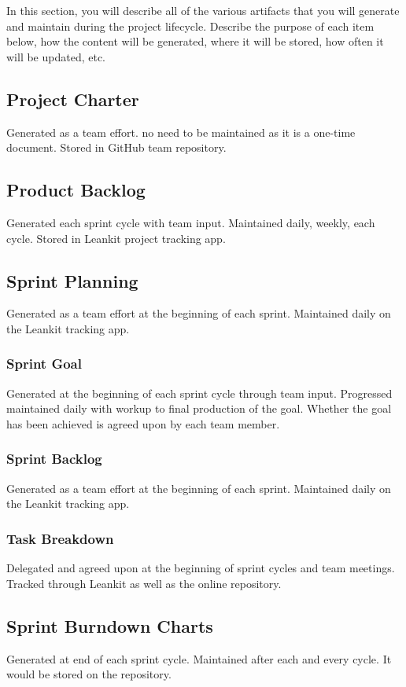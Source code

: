 In this section, you will describe all of the various artifacts that you will generate and maintain during the project lifecycle. Describe the purpose of each item below, how the content will be generated, where it will be stored, how often it will be updated, etc. 

\subsection{Project Charter}
Generated as a team effort. no need to be maintained as it is a one-time document. Stored in GitHub team repository.

\subsection{Product Backlog}
Generated each sprint cycle with team input. Maintained daily, weekly, each cycle. Stored in Leankit project tracking app.

\subsection{Sprint Planning}
Generated as a team effort at the beginning of each sprint. Maintained daily on the Leankit tracking app.

\subsubsection{Sprint Goal}
Generated at the beginning of each sprint cycle through team input. Progressed maintained daily with workup to final production of the goal. Whether the goal has been achieved is agreed upon by each team member.

\subsubsection{Sprint Backlog}
Generated as a team effort at the beginning of each sprint. Maintained daily on the Leankit tracking app.

\subsubsection{Task Breakdown}
Delegated and agreed upon at the beginning of sprint cycles and team meetings. Tracked through Leankit as well as the online repository.

\subsection{Sprint Burndown Charts}
Generated at end of each sprint cycle. Maintained after each and every cycle. It would be stored on the repository.

